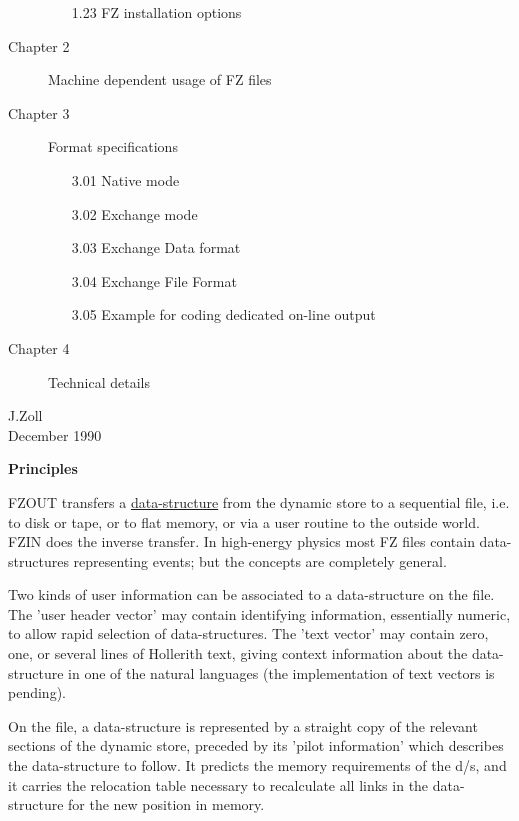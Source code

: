 \begin{description}
\begin{itemize}
     \item[1.23] FZ installation options
  \end{itemize}
  \item[Chapter 2] Machine dependent usage of FZ files
  \item[Chapter 3] Format specifications
  \begin{itemize}
     \item[3.01] Native mode
     \item[3.02] Exchange mode
     \item[3.03] Exchange Data format
     \item[3.04] Exchange File Format
     \item[3.05] Example for coding dedicated on-line output
  \end{itemize}
  \item[Chapter 4] Technical details
\end{description}
\vspace*{10pt}
\begin{center}
  J.Zoll\\
  December 1990
\end{center}
\cleardoublepage  %
\begin{center}
  {\large\bf{Principles}}
\end{center}
\par
FZOUT transfers a
\underline{data-structure}
from the dynamic store to a sequential file, i.e. to disk or tape,
or to flat memory, or via a user routine to the outside world.
FZIN does the inverse transfer.
In high-energy physics most FZ files contain data-structures
representing events; but the concepts are completely general.
\par
Two kinds of user information can be associated to a
data-structure on the file.
The 'user header vector' may contain identifying information,
essentially numeric, to allow rapid selection of data-structures.
The 'text vector' may contain zero,
one, or several lines of Hollerith text,
giving context information about the data-structure in one of the
natural languages
(the implementation of text vectors is pending).
\par
On the file, a data-structure is represented by a straight
copy of the relevant sections of the dynamic store,
preceded by its 'pilot information' which describes
the data-structure to follow.
It predicts the memory requirements of the d/s,
and it carries the relocation table necessary to recalculate all
links in the data-structure for the new position in memory.
